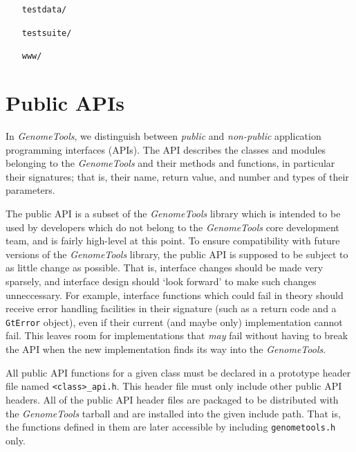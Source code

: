 \documentclass[11pt,final]{article}
\newcommand{\keyword}[1]{\lstinline{#1}}
\newcommand{\Gt}[0]{\emph{GenomeTools}\xspace}
\begin{document}
\begin{itemize}
\begin{itemize}
             annotation code,
       \item the \texttt{src/match} subdir with code for index structure
             construction and access, short read mapping, matching algorithms
             etc.,
       \item the \texttt{src/mgth} subdir contains \emph{MetaGenomeThreader}
             code,
       \item the \texttt{src/patches} subdirectory with platform-specific
             patches, and
       \item the \texttt{tools} subdir with code for all the tools included with
             \Gt .
     \end{itemize}     
\item[\texttt{testdata/}]
\item[\texttt{testsuite/}]
\item[\texttt{www/}]
\end{itemize}


\section{Public APIs}

In \Gt , we distinguish between \emph{public} and \emph{non-public} application
programming interfaces (APIs). The API describes the classes and modules
belonging to the \Gt and their methods and functions, in particular their
signatures; that is, their name, return value, and number and types of their
parameters.

The public API is a subset of the \Gt library which is intended to be used by
developers which do not belong to the \Gt core development team, and is fairly
high-level at this point. To ensure compatibility with future versions of the
\Gt library, the public API is supposed to be subject to as little change as
possible. That is, interface changes should be made very sparsely, and interface
design should `look forward' to make such changes unneccessary. For example,
interface functions which could fail in theory should receive error handling facilities
in their signature (such as a return code and a \keyword{GtError} object), even
if their current (and maybe only) implementation cannot fail. This leaves room
for implementations that \emph{may} fail without having to break the API when
the new implementation finds its way into the \Gt .

All public API functions for a given class must be declared in a prototype
header file named \keyword{<class>_api.h}. This header file must only include
other public API headers. All of the public API header files are packaged to be
distributed with the \Gt tarball and are installed into the given include path.
That is, the functions defined in them are later accessible by including
\keyword{genometools.h} only.
\end{document}
